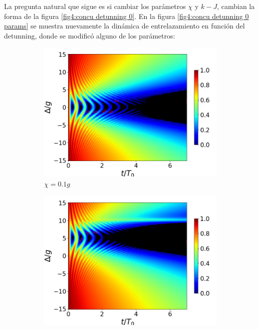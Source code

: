 La pregunta natural que sigue es si cambiar los parámetros $\chi$ y $k-J$, cambian la forma de la figura \ref{fig4:concu detunning 0}. En la figura \ref{fig4:concu detunning 0 params} se muestra nuevamente la dinámica de entrelazamiento en función del detunning, donde se modificó alguno de los parámetros:

\begin{figure}[h]
    \centering
    \begin{subfigure}{0.49\textwidth}
        \includegraphics[width=\textwidth]{figuras/ch4/concu/delta/eg0+ge0 k=0.0g x=0.1g J=0.0g gamma=0.25g concu delta dis.png}
        \caption{$\chi=0.1g$}
        \label{fig4:concu detunning x1}
    \end{subfigure}
    \hfill
    \begin{subfigure}{0.49\textwidth}
        \includegraphics[width=\textwidth]{figuras/ch4/concu/delta/eg0+ge0 k=0.0g x=5.0g J=0.0g gamma=0.25g concu delta dis.png}

\end{subfigure}
\end{figure}

